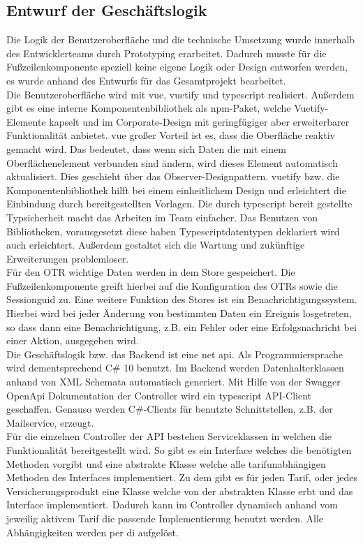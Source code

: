 \subsection{Entwurf der Geschäftslogik}
\label{geschaeftslogik}
Die Logik der Benutzeroberfläche und die technische Umsetzung wurde innerhalb des Entwicklerteams durch Prototyping erarbeitet.
Dadurch musste für die Fußzeilenkomponente speziell keine eigene Logik oder Design entworfen werden, es wurde anhand des Entwurfs für das Gesamtprojekt bearbeitet.\\
Die Benutzeroberfläche wird mit \gls{vue}, \gls{vuetify} und \gls{typescript} realisiert. Außerdem gibt es eine interne Komponentenbibliothek als \gls{npm}-Paket, welche Vuetify-Elemente kapselt und im Corporate-Design mit geringfügiger aber erweiterbarer Funktionalität anbietet. \gls{vue} großer Vorteil ist es, dass die Oberfläche reaktiv gemacht wird. Das bedeutet, dass wenn sich Daten die mit einem Oberflächenelement verbunden sind ändern, wird dieses Element automatisch aktualisiert. Dies geschieht über das Observer-Designpattern. \gls{vuetify} bzw. die Komponentenbibliothek hilft bei einem einheitlichem Design und erleichtert die Einbindung durch bereitgestellten Vorlagen. Die durch \gls{typescript} bereit gestellte Typsicherheit macht das Arbeiten im Team einfacher. Das Benutzen von Bibliotheken, vorausgesetzt diese haben Typescriptdatentypen deklariert wird auch erleichtert. Außerdem gestaltet sich die Wartung und zukünftige Erweiterungen problemloser.\\
Für den \ac{OTR} wichtige Daten werden in dem Store gespeichert. Die Fußzeilenkomponente greift hierbei auf die Konfiguration des \ac{OTR}s sowie die Sessionguid zu.
Eine weitere Funktion des Stores ist ein Benachrichtigungssystem. Hierbei wird bei jeder Änderung von bestimmten Daten ein Ereignis losgetreten, so dass dann eine Benachrichtigung, z.B. ein Fehler oder eine Erfolgsnachricht bei einer Aktion, ausgegeben wird.\\
Die Geschäftslogik bzw. das Backend ist eine \gls{net} \gls{api}. Als Programmiersprache wird dementsprechend C\# 10 benutzt.
Im Backend werden Datenhalterklassen anhand von XML Schemata automatisch generiert. Mit Hilfe von der Swagger OpenApi Dokumentation der Controller wird ein \gls{typescript} API-Client geschaffen. Genauso werden C\#-Clients für benutzte Schnittstellen, z.B. der Mailservice, erzeugt.\\
Für die einzelnen Controller der API bestehen Serviceklassen in welchen die Funktionalität bereitgestellt wird. So gibt es ein Interface welches die benötigten Methoden vorgibt und eine abstrakte Klasse welche alle tarifunabhängigen Methoden des Interfaces implementiert. Zu dem gibt es für jeden Tarif, oder jedes Versicherungsprodukt eine Klasse welche von der abstrakten Klasse erbt und das Interface implementiert. Dadurch kann im Controller dynamisch anhand vom jeweilig aktivem Tarif die passende Implementierung benutzt werden. %
Alle Abhängigkeiten werden per \gls{di} aufgelöst.
